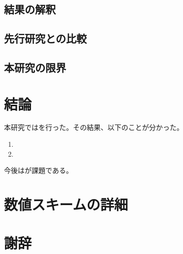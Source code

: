 \documentclass[a4paper,11pt,twoside,openright]{ltjsbook}
\begin{document}
\section{結果の解釈}
\label{sec:discussion_interpretation}


\section{先行研究との比較}
\label{sec:discussion_comparison}


\section{本研究の限界}
\label{sec:discussion_limitation}



\chapter{結論}
\label{chap:conclusion}


本研究ではを行った。その結果、以下のことが分かった。

\begin{enumerate}
  \item {}
  \item {}
\end{enumerate}

今後はが課題である。

\appendix
\chapter{数値スキームの詳細}
\label{chap:appendix}

\backmatter
\chapter{謝辞}
\end{document}
